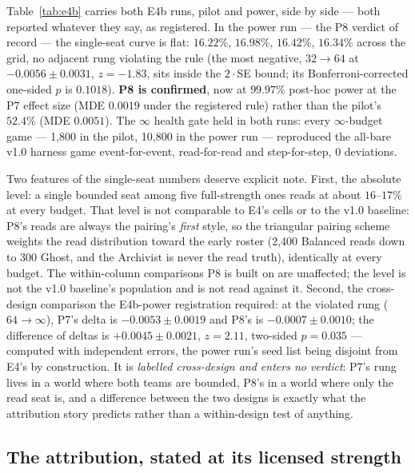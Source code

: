 \documentclass[11pt]{article}
\begin{document}
Table~\ref{tab:e4b} carries both E4b runs, pilot and power, side by side --- both
reported whatever they say, as registered. In the power run --- the P8 verdict of
record --- the single-seat curve is flat: $16.22\%$, $16.98\%$, $16.42\%$, $16.34\%$
across the grid, no adjacent rung violating the rule (the most negative,
$32 {\to} 64$ at $-0.0056 \pm 0.0031$, $z = -1.83$, sits inside the $2 \cdot$SE bound;
its Bonferroni-corrected one-sided $p$ is $0.1018$). \textbf{P8 is confirmed}, now at
$99.97\%$ post-hoc power at the P7 effect size (MDE $0.0019$ under the registered
rule) rather than the pilot's $52.4\%$ (MDE $0.0051$). The $\infty$ health gate held
in both runs: every $\infty$-budget game --- 1{,}800 in the pilot, 10{,}800 in the
power run --- reproduced the all-bare v1.0 harness game event-for-event,
read-for-read and step-for-step, 0 deviations.

Two features of the single-seat numbers deserve explicit note. First, the absolute
level: a single bounded seat among five full-strength ones reads at about $16$--$17\%$
at every budget. That level is not comparable to E4's cells or to the v1.0 baseline:
P8's reads are always the pairing's \emph{first} style, so the
triangular pairing scheme weights the read distribution toward the early roster
(2{,}400 Balanced reads down to 300 Ghost, and the Archivist is never the read truth),
identically at every budget. The within-column comparisons P8 is built on are
unaffected; the level is not the v1.0 baseline's population and is not read against
it. Second, the cross-design comparison the E4b-power registration required: at the
violated rung ($64 {\to} \infty$), P7's delta is $-0.0053 \pm 0.0019$ and P8's is
$-0.0007 \pm 0.0010$; the difference of deltas is $+0.0045 \pm 0.0021$, $z = 2.11$,
two-sided $p = 0.035$ --- computed with independent errors, the power run's seed list
being disjoint from E4's by construction. It is \emph{labelled cross-design and enters
no verdict}: P7's rung lives in a world where both teams are bounded, P8's in a world
where only the read seat is, and a difference between the two designs is exactly what
the attribution story predicts rather than a within-design test of anything.

\subsection{The attribution, stated at its licensed strength}
\label{sec:attribution}
\end{document}

